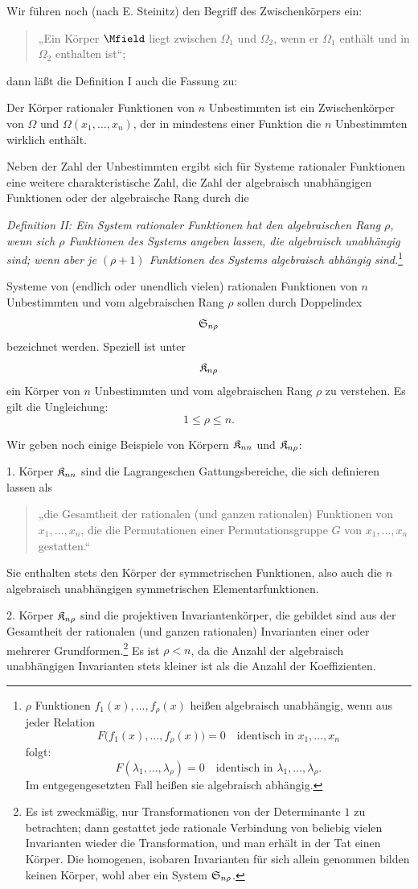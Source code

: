 Wir führen noch (nach E. Steinitz) den Begriff des Zwischenkörpers ein:
\begin{quote}
„Ein Körper $\Mfield$ liegt zwischen $\Omega_1$ und $\Omega_2$, wenn er $\Omega_1$ enthält und in $\Omega_2$ enthalten ist“;
\end{quote}
dann läßt die Definition I auch die Fassung zu:

Der Körper rationaler Funktionen von $n$ Unbestimmten ist ein Zwischenkörper von $\Omega$ und $\Omega(x_1,\ldots,x_n)$, der in mindestens einer Funktion die $n$ Unbestimmten wirklich enthält.

Neben der Zahl der Unbestimmten ergibt sich für Systeme rationaler Funktionen eine weitere charakteristische Zahl, die Zahl der algebraisch unabhängigen Funktionen oder der algebraische Rang durch die

\emph{Definition II: Ein System rationaler Funktionen hat den algebraischen Rang $\rho$, wenn sich $\rho$ Funktionen des Systems angeben lassen, die algebraisch unabhängig sind; wenn aber je $(\rho+1)$ Funktionen des Systems algebraisch abhängig sind.}\footnote{$\rho$ Funktionen $f_1(x),\ldots,f_\rho(x)$ heißen algebraisch unabhängig, wenn aus jeder Relation
\[
F\bigl(f_1(x),\ldots,f_\rho(x)\bigr)=0\quad\text{identisch in }x_1,\ldots,x_n
\]
folgt:
\[
F(\lambda_1,\ldots,\lambda_\rho)=0\quad\text{identisch in }\lambda_1,\ldots,\lambda_\rho.
\]
Im entgegengesetzten Fall heißen sie algebraisch abhängig.}

Systeme von (endlich oder unendlich vielen) rationalen Funktionen von $n$ Unbestimmten und vom algebraischen Rang $\rho$ sollen durch Doppelindex
\[
  \mathfrak{S}_{n\rho}
\]
bezeichnet werden. Speziell ist unter
\[
  \mathfrak{K}_{n\rho}
\]
ein Körper von $n$ Unbestimmten und vom algebraischen Rang $\rho$ zu verstehen. Es gilt die Ungleichung:
\[
  1\leq \rho\leq n.
\]

Wir geben noch einige Beispiele von Körpern $\mathfrak{K}_{nn}$ und $\mathfrak{K}_{n\rho}$:

1. Körper $\mathfrak{K}_{nn}$ sind die Lagrangeschen Gattungsbereiche, die sich definieren lassen als
\begin{quote}
„die Gesamtheit der rationalen (und ganzen rationalen) Funktionen von $x_1,\ldots,x_n$, die die Permutationen einer Permutationsgruppe $G$ von $x_1,\ldots,x_n$ gestatten.“
\end{quote}
Sie enthalten stets den Körper der symmetrischen Funktionen, also auch die $n$ algebraisch unabhängigen symmetrischen Elementarfunktionen.

2. Körper $\mathfrak{K}_{n\rho}$ sind die projektiven Invariantenkörper, die gebildet sind aus der Gesamtheit der rationalen (und ganzen rationalen) Invarianten einer oder mehrerer Grundformen.\footnote{Es ist zweckmäßig, nur Transformationen von der Determinante $1$ zu betrachten; dann gestattet jede rationale Verbindung von beliebig vielen Invarianten wieder die Transformation, und man erhält in der Tat einen Körper. Die homogenen, isobaren Invarianten für sich allein genommen bilden keinen Körper, wohl aber ein System $\mathfrak{S}_{n\rho}$.} Es ist $\rho<n$, da die Anzahl der algebraisch unabhängigen Invarianten stets kleiner ist als die Anzahl der Koeffizienten.

